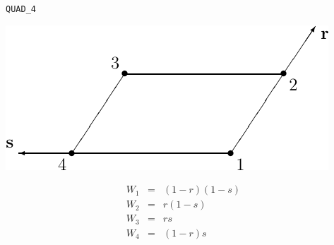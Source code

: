 \vspace{\baselineskip}
\texttt{QUAD\_4}\\[-2\baselineskip]
\begin{center}
\begin{minipage}[t]{0.5\linewidth}
   \centering
   \vspace{0pt}
   \includegraphics{cnct.figs/cnct_unst_quad4}
\end{minipage}%
\begin{minipage}[t]{0.5\linewidth}
   \vspace{-\abovedisplayskip}
   \begin{eqnarray*}
      W_1 &=& (1-r)(1-s) \\
      W_2 &=& r(1-s) \\
      W_3 &=& rs \\
      W_4 &=& (1-r)s
   \end{eqnarray*}
\end{minipage}
\end{center}

